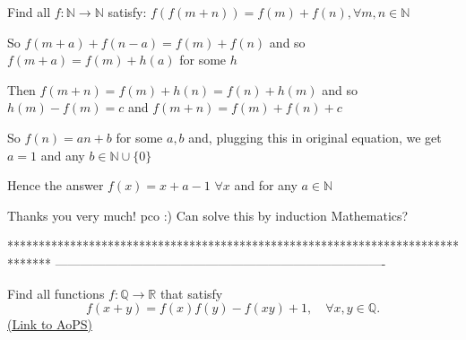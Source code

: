 \begin{solution}
	\begin{tcolorbox}Find all $f:\mathbb{N}\rightarrow \mathbb{N}$ satisfy:
$f(f(m+n))=f(m)+f(n), \forall m, n\in \mathbb{N}$\end{tcolorbox}
So $f(m+a)+f(n-a)=f(m)+f(n)$ and so $f(m+a)=f(m)+h(a)$ for some $h$

Then $f(m+n)=f(m)+h(n)=f(n)+h(m)$ and so $h(m)-f(m)=c$ and $f(m+n)=f(m)+f(n)+c$

So $f(n)=an+b$ for some $a,b$ and, plugging this in original equation, we get $a=1$ and any $b\in\mathbb N\cup\{0\}$

Hence the answer $\boxed{f(x)=x+a-1}$ $\forall x$ and for any $a\in\mathbb N$
\end{solution}



\begin{solution}
	Thanks you very much! pco :)
Can solve this by induction Mathematics?
\end{solution}
*******************************************************************************
-------------------------------------------------------------------------------

\begin{problem}
	Find all functions $f:\mathbb{Q}\to\mathbb{R}$ that satisfy
\[f(x+y)=f(x)f(y)-f(xy)+1,\quad \forall x, y\in \mathbb{Q}.\]
	\flushright \href{https://artofproblemsolving.com/community/c6h401194}{(Link to AoPS)}
\end{problem}



